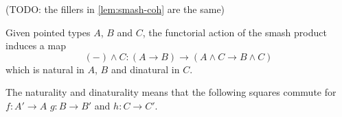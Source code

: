 \documentclass{article}
\newcommand{\pmap}{\to}
\newcommand{\smsh}{\wedge}
\begin{document}
\begin{lem}
	(TODO: the fillers in \autoref{lem:smash-coh} are the same)
\end{lem}

\begin{thm}\label{thm:smash-functor-right}
Given pointed types $A$, $B$ and $C$, the functorial action of the smash product induces a map
$$({-})\smsh C:(A\pmap B)\pmap(A\smsh C\pmap B\smsh C)$$
which is natural in $A$, $B$ and dinatural in $C$.
\end{thm}
The naturality and dinaturality means that the following squares commute for $f : A' \to A$ $g:B\to B'$ and $h:C\to C'$.
\begin{center}
\qquad
{}
\end{center}
\end{document}
